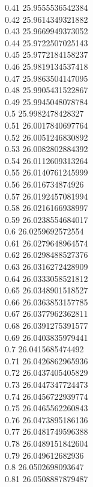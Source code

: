 {0.41	25.9555536542384\\
0.42	25.9614349321882\\
0.43	25.9669949373052\\
0.44	25.9722507025143\\
0.45	25.9772184158237\\
0.46	25.9819134537418\\
0.47	25.9863504147095\\
0.48	25.9905431522867\\
0.49	25.9945048078784\\
0.5	25.9982478428327\\
0.51	26.0017840697764\\
0.52	26.0051246830892\\
0.53	26.0082802884392\\
0.54	26.0112609313264\\
0.55	26.0140761245999\\
0.56	26.016734874926\\
0.57	26.0192457081994\\
0.58	26.0216166938997\\
0.59	26.0238554684017\\
0.6	26.0259692572554\\
0.61	26.0279648964574\\
0.62	26.0298488527376\\
0.63	26.0316272428909\\
0.64	26.0333058521812\\
0.65	26.0348901518527\\
0.66	26.0363853157785\\
0.67	26.0377962362811\\
0.68	26.0391275391577\\
0.69	26.0403835979441\\
0.7	26.0415685474492\\
0.71	26.0426862965936\\
0.72	26.0437405405829\\
0.73	26.0447347724473\\
0.74	26.0456722939774\\
0.75	26.0465562260843\\
0.76	26.0473895186136\\
0.77	26.0481749596388\\
0.78	26.0489151842604\\
0.79	26.049612682936\\
0.8	26.0502698093647\\
0.81	26.0508887879487\\
}

